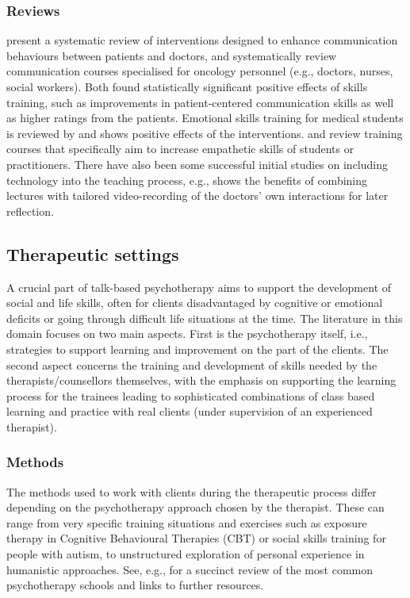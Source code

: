 \documentclass[prodmode,acmtochi]{acmsmall}
\begin{document}
\subsubsection*{Reviews}  present a systematic review of interventions designed to enhance communication behaviours between patients and doctors, and  systematically review communication courses specialised for oncology personnel (e.g., doctors, nurses, social workers). Both  found statistically significant positive effects of skills training, such as improvements in patient-centered communication skills as well as higher ratings from the patients. Emotional skills training for medical students is reviewed by \cite{Satterfield2007} and shows positive effects of the interventions.  and  review training courses that specifically aim to increase empathetic skills of students or practitioners. There have also been some successful initial studies
on including technology into the teaching process, e.g., 
shows the benefits of combining lectures with tailored video-recording of
the doctors' own interactions for later reflection.



\subsection{Therapeutic settings}
A crucial part of talk-based psychotherapy aims to support the development of social and life skills, often for clients  disadvantaged by cognitive or emotional deficits or going through difficult life situations at the time. %
%
The literature in this domain focuses on two main aspects. First is the psychotherapy itself, i.e., strategies to support learning and improvement on the part of the clients. The second aspect concerns the training and development of skills needed by the therapists/counsellors themselves, with the emphasis on supporting the learning process for the trainees leading to sophisticated combinations of class based learning and practice with real clients (under supervision of an experienced therapist). 



\subsubsection*{Methods}  
The methods used to work with clients during the therapeutic process differ depending on the psychotherapy approach chosen by the therapist. These can range from very specific training situations and exercises such as exposure therapy in Cognitive Behavioural Therapies (CBT) or social skills training for people with autism, to unstructured exploration of personal experience in humanistic approaches.  See, e.g.,  for a succinct review of the most common psychotherapy schools and links to further resources. 
\end{document}

